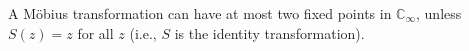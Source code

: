 A Möbius transformation can have at most two fixed points in $\mathbb{C}_\infty$, unless $S(z) = z$ for all $z$ (i.e., $S$ is the identity transformation).
